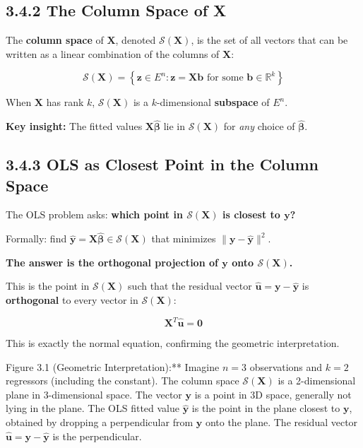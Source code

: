 \subsection{3.4.2 The Column Space of X}

The \textbf{column space} of $\mathbf{X}$, denoted $\mathcal{S}(\mathbf{X})$, is the set of all vectors that can be written as a linear combination of the columns of $\mathbf{X}$:

\[
\mathcal{S}(\mathbf{X}) = \left\{\mathbf{z} \in E^n : \mathbf{z} = \mathbf{X}\mathbf{b} \text{ for some } \mathbf{b} \in \mathbb{R}^k\right\}
\]

When $\mathbf{X}$ has rank $k$, $\mathcal{S}(\mathbf{X})$ is a $k$-dimensional \textbf{subspace} of $E^n$.

\textbf{Key insight:} The fitted values $\mathbf{X}\hat{\boldsymbol{\beta}}$ lie in $\mathcal{S}(\mathbf{X})$ for \textit{any} choice of $\hat{\boldsymbol{\beta}}$.

\subsection{3.4.3 OLS as Closest Point in the Column Space}

The OLS problem asks: \textbf{which point in $\mathcal{S}(\mathbf{X})$ is closest to $\mathbf{y}$?}

Formally: find $\hat{\mathbf{y}} = \mathbf{X}\hat{\boldsymbol{\beta}} \in \mathcal{S}(\mathbf{X})$ that minimizes $\|\mathbf{y} - \hat{\mathbf{y}}\|^2$.

\textbf{The answer is the orthogonal projection of $\mathbf{y}$ onto $\mathcal{S}(\mathbf{X})$.}

This is the point in $\mathcal{S}(\mathbf{X})$ such that the residual vector $\hat{\mathbf{u}} = \mathbf{y} - \hat{\mathbf{y}}$ is \textbf{orthogonal} to every vector in $\mathcal{S}(\mathbf{X})$:

\[
\mathbf{X}^T \hat{\mathbf{u}} = \mathbf{0}
\]

This is exactly the normal equation, confirming the geometric interpretation.

\begin{keybox}{Figure 3.1 (Geometric Interpretation):** Imagine $n = 3$ observations and $k = 2$ regressors (including the constant). The column space $\mathcal{S}(\mathbf{X})$ is a 2-dimensional plane in 3-dimensional space. The vector $\mathbf{y}$ is a point in 3D space, generally not lying in the plane. The OLS fitted value $\hat{\mathbf{y}}$ is the point in the plane closest to $\mathbf{y}$, obtained by dropping a perpendicular from $\mathbf{y}$ onto the plane. The residual vector $\hat{\mathbf{u}} = \mathbf{y} - \hat{\mathbf{y}}$ is the perpendicular.}
\end{keybox}

